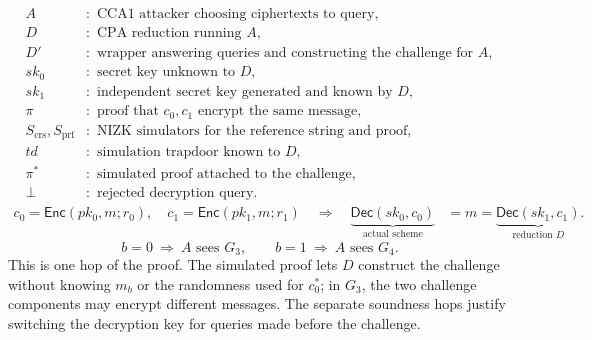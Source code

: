 \documentclass[12pt,a4paper]{article}
\begin{document}
\endgroup
\[
\begin{aligned}
A&:\text{ CCA1 attacker choosing ciphertexts to query},\\
D&:\text{ CPA reduction running }A,\\
D'&:\text{ wrapper answering queries and constructing the challenge for }A,\\
sk_0&:\text{ secret key unknown to }D,\\
sk_1&:\text{ independent secret key generated and known by }D,\\
\pi&:\text{ proof that }c_0,c_1\text{ encrypt the same message},\\
S_{\mathrm{crs}},S_{\mathrm{prf}}&:\text{ NIZK simulators for the reference string and proof},\\
td&:\text{ simulation trapdoor known to }D,\\
\pi^*&:\text{ simulated proof attached to the challenge},\\
\bot&:\text{ rejected decryption query}.
\end{aligned}
\]
\[
\begin{aligned}
c_0=\mathsf{Enc}(pk_0,m;r_0),\quad
c_1=\mathsf{Enc}(pk_1,m;r_1)
\quad\Longrightarrow\quad
\underbrace{\mathsf{Dec}(sk_0,c_0)}_{\text{actual scheme}}
&=m=
\underbrace{\mathsf{Dec}(sk_1,c_1)}_{\text{reduction }D}.
\end{aligned}
\]
\[
b=0\ \Longrightarrow\ A\text{ sees }G_3,
\qquad
b=1\ \Longrightarrow\ A\text{ sees }G_4.
\]
This is one hop of the proof. The simulated proof lets $D$ construct the
challenge without knowing $m_b$ or the randomness used for $c_0^*$;
in $G_3$, the two challenge components may encrypt different messages.
The separate soundness hops justify switching the decryption key for
queries made before the challenge.

\clearpage
\end{document}
